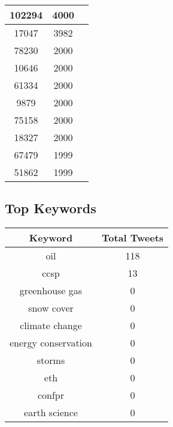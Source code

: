 \documentclass{article}\usepackage[T1]{fontenc}
\begin{document}
\begin{tabular}{|c|c|c|}
 \hline
102294 & 4000\\ 
 \hline
17047 & 3982\\ 
 \hline
78230 & 2000\\ 
 \hline
10646 & 2000\\ 
 \hline
61334 & 2000\\ 
 \hline
9879 & 2000\\ 
 \hline
75158 & 2000\\ 
 \hline
18327 & 2000\\ 
 \hline
67479 & 1999\\ 
 \hline
51862 & 1999\\ 
 \hline
\end{tabular}\subsection*{Top Keywords}\begin{tabular}{|c|c|}         \hline         Keyword & Total Tweets \\ 
 \hline
oil & 118\\ 
 \hline
ccsp & 13\\ 
 \hline
greenhouse gas & 0\\ 
 \hline
snow cover & 0\\ 
 \hline
climate change & 0\\ 
 \hline
energy conservation & 0\\ 
 \hline
storms & 0\\ 
 \hline
eth & 0\\ 
 \hline
confpr & 0\\ 
 \hline
earth science & 0\\ 
 \hline
\end{tabular}
\end{document}
